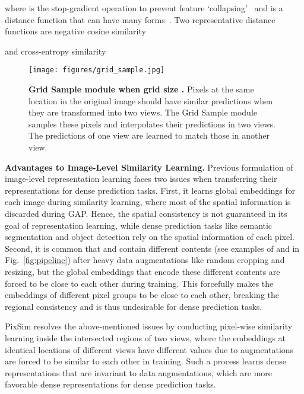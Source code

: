 \documentclass[runningheads]{llncs}
\newcommand{\myparagraph}[1]{{\noindent\bf #1}}
\begin{document}
where  is the stop-gradient operation to prevent feature `collapsing'~\cite{simsiam} and  is a distance function that can have many forms~\cite{simsiam, swav}.
Two representative distance functions are negative cosine similarity~\cite{simsiam, byol}

and cross-entropy similarity


\begin{figure}[t]
	\centering
	\begin{minipage}[]{.50\linewidth}
\texttt{[image: figures/grid\_sample.jpg]}
\end{minipage}
	\begin{minipage}[]{.48\linewidth}
\caption{\small{\textbf{Grid Sample module when grid size .}
		Pixels at the same location in the original image should have similar predictions when they are transformed into two views.
		The Grid Sample module samples these pixels and interpolates their predictions in two views.
		The predictions of one view are learned to match those in another view.
		}}\label{fig:gridsample}
	\end{minipage}
\end{figure}


\myparagraph{Advantages to Image-Level Similarity Learning.}
Previous formulation of image-level representation learning faces two issues when transferring their representations for dense prediction tasks.
First, it learns global embeddings for each image during similarity learning, where most of the spatial information is discarded during GAP.
Hence, the spatial consistency is not guaranteed in its goal of representation learning,
while dense prediction tasks like semantic segmentation and object detection rely on the spatial information of each pixel.
Second, it is common that  and  contain different contents (see examples of  and  in Fig.~\ref{fig:pipeline}) after heavy data augmentations like random cropping and resizing,
but the global embeddings that encode these different contents are forced to be close to each other during training.
This forcefully makes the embeddings of different pixel groups to be close to each other, breaking the regional consistency and is thus undesirable for dense prediction tasks.

PixSim resolves the above-mentioned issues by conducting pixel-wise similarity learning inside the intersected regions of two views,
where the embeddings at identical locations of different views have different values due to augmentations~\cite{simclr} are forced to be similar to each other in training.
Such a process learns dense representations that are invariant to data augmentations,
which are more favorable dense representations for dense prediction tasks.
\end{document}
